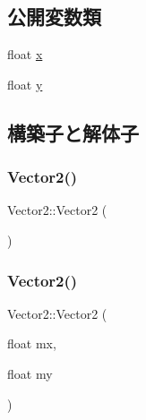 \subsection*{公開変数類}
\begin{DoxyCompactItemize}
\item 
float \mbox{\hyperlink{struct_math_1_1_vector2_a32d5ba430ca4426f90166af92e7bfd10}{x}}
\item 
float \mbox{\hyperlink{struct_math_1_1_vector2_ad6454a7c7a58d8814e2ec7b78743c63c}{y}}
\end{DoxyCompactItemize}


\subsection{構築子と解体子}
\mbox{\label{struct_math_1_1_vector2_a22104d1809be26a419ef1f959e3761bf}} 
\subsubsection{\texorpdfstring{Vector2()}{Vector2()}\hspace{0.1cm}{\footnotesize\ttfamily [1/4]}}
{\footnotesize\ttfamily Vector2\+::\+Vector2 (\begin{DoxyParamCaption}{ }\end{DoxyParamCaption})}

\mbox{\label{struct_math_1_1_vector2_a86e30f36645e679633abd3d9c7f7b4a0}} 
\subsubsection{\texorpdfstring{Vector2()}{Vector2()}\hspace{0.1cm}{\footnotesize\ttfamily [2/4]}}
{\footnotesize\ttfamily Vector2\+::\+Vector2 (\begin{DoxyParamCaption}\item[{float}]{mx,  }\item[{float}]{my }\end{DoxyParamCaption})}

\mbox{\label{struct_math_1_1_vector2_ac0c70e89b089fb619dae62c32ccde4ec}} 

